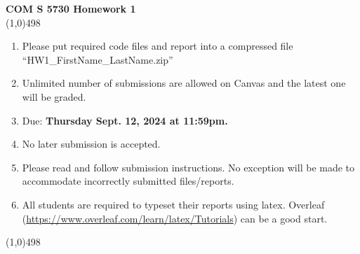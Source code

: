 \documentclass[11pt]{article}
\begin{document}
\begin{center}
{\Large \textbf{COM S 5730 Homework 1}}\\

\linethickness{1mm}\line(1,0){498}

\begin{enumerate}
\item Please put required code files and report into a
compressed file ``HW1\_FirstName\_LastName.zip''
\item Unlimited number of submissions are
allowed on Canvas and the latest one will be graded.
\item Due: \textbf{Thursday Sept. 12, 2024 at 11:59pm.}
\item {\color{red} No later submission is accepted.}
\item Please read and follow submission instructions. No exception
will be made to accommodate incorrectly submitted files/reports.
\item All students are required to typeset their reports using
latex. Overleaf
(\url{https://www.overleaf.com/learn/latex/Tutorials}) can be a
good start.
\end{enumerate}

\linethickness{1mm}\line(1,0){498}

\end{center}


\end{document}
